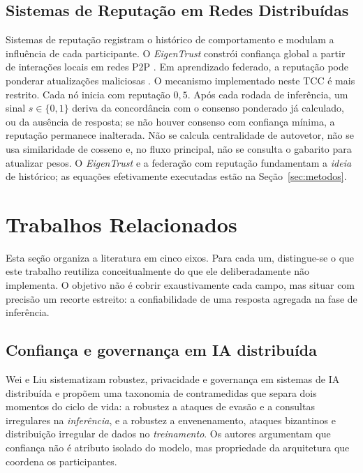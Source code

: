 \documentclass[12pt]{article}
\begin{document}
\subsection{Sistemas de Reputação em Redes Distribuídas}

Sistemas de reputação registram o histórico de comportamento e modulam a influência de cada participante. O \textit{EigenTrust} constrói confiança global a partir de interações locais em redes P2P \cite{kamvar2003}. Em aprendizado federado, a reputação pode ponderar atualizações maliciosas \cite{chen2024}. O mecanismo implementado neste TCC é mais restrito. Cada nó inicia com reputação $0{,}5$. Após cada rodada de inferência, um sinal $s \in \{0,1\}$ deriva da concordância com o consenso ponderado já calculado, ou da ausência de resposta; se não houver consenso com confiança mínima, a reputação permanece inalterada. Não se calcula centralidade de autovetor, não se usa similaridade de cosseno e, no fluxo principal, não se consulta o gabarito para atualizar pesos. O \textit{EigenTrust} e a federação com reputação fundamentam a \emph{ideia} de histórico; as equações efetivamente executadas estão na Seção~\ref{sec:metodos}.

\section{Trabalhos Relacionados}
\label{sec:relacionados}

Esta seção organiza a literatura em cinco eixos. Para cada um, distingue-se o que este trabalho reutiliza conceitualmente do que ele deliberadamente não implementa. O objetivo não é cobrir exaustivamente cada campo, mas situar com precisão um recorte estreito: a confiabilidade de uma resposta agregada na fase de inferência.

\subsection{Confiança e governança em IA distribuída}

Wei e Liu \cite{wei2025} sistematizam robustez, privacidade e governança em sistemas de IA distribuída e propõem uma taxonomia de contramedidas que separa dois momentos do ciclo de vida: a robustez a ataques de evasão e a consultas irregulares na \textit{inferência}, e a robustez a envenenamento, ataques bizantinos e distribuição irregular de dados no \textit{treinamento}. Os autores argumentam que confiança não é atributo isolado do modelo, mas propriedade da arquitetura que coordena os participantes.
\end{document}

